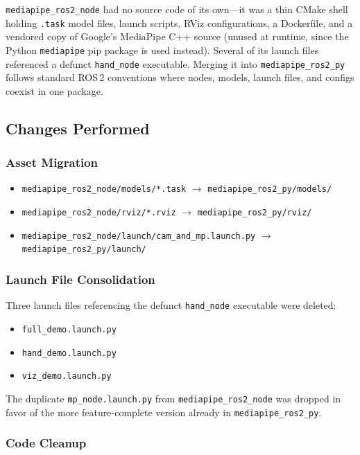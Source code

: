 \documentclass[11pt,a4paper]{article}
\begin{document}
\texttt{mediapipe\_ros2\_node} had no source code of its own---it was a thin CMake shell holding \texttt{.task} model files, launch scripts, RViz configurations, a Dockerfile, and a vendored copy of Google's MediaPipe C++ source (unused at runtime, since the Python \texttt{mediapipe} pip package is used instead). Several of its launch files referenced a defunct \texttt{hand\_node} executable. Merging it into \texttt{mediapipe\_ros2\_py} follows standard ROS\,2 conventions where nodes, models, launch files, and configs coexist in one package.

\subsection{Changes Performed}

\subsubsection{Asset Migration}

\begin{itemize}
    \item \texttt{mediapipe\_ros2\_node/models/*.task} $\rightarrow$ \texttt{mediapipe\_ros2\_py/models/}
    \item \texttt{mediapipe\_ros2\_node/rviz/*.rviz} $\rightarrow$ \texttt{mediapipe\_ros2\_py/rviz/}
    \item \texttt{mediapipe\_ros2\_node/launch/cam\_and\_mp.launch.py} $\rightarrow$ \texttt{mediapipe\_ros2\_py/launch/}
\end{itemize}

\subsubsection{Launch File Consolidation}

Three launch files referencing the defunct \texttt{hand\_node} executable were deleted:
\begin{itemize}
    \item \texttt{full\_demo.launch.py}
    \item \texttt{hand\_demo.launch.py}
    \item \texttt{viz\_demo.launch.py}
\end{itemize}

The duplicate \texttt{mp\_node.launch.py} from \texttt{mediapipe\_ros2\_node} was dropped in favor of the more feature-complete version already in \texttt{mediapipe\_ros2\_py}.

\subsubsection{Code Cleanup}
\end{document}
